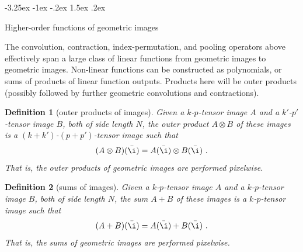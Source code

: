 \documentclass{article}
\makeatletter
\theoremstyle{plain}
\newtheorem{definition}{Definition}
\renewcommand\section{\@startsection {section}{1}{\z@}%
  {-3.25ex \@plus -1ex \@minus -.2ex}%
  {1.5ex \@plus .2ex}%
  {\raggedright\normalfont\large\bfseries}}
\makeatother
\begin{document}
\section{Higher-order functions of geometric images}\label{sec:nonlinear}

The convolution, contraction, index-permutation, and pooling operators above effectively span a large class of linear functions from geometric images to geometric images. Non-linear functions can be constructed as polynomials, or sums of products of linear function outputs.
Products here will be outer products (possibly followed by further geometric convolutions and contractions).

\begin{definition}[outer products of images]
Given a $k$-$p$-tensor image $A$ and a $k'$-$p'$-tensor image $B$, both of side length $N$, the outer product $A\otimes B$ of these images is a $(k+k')$-$(p+p')$-tensor image such that
\begin{equation}
    (A\otimes B)(\bar\i) = A(\bar\i)\otimes B(\bar\i) ~.
\end{equation}
That is, the outer products of geometric images are performed pixelwise.
\end{definition}

\begin{definition}[sums of images]
Given a $k$-$p$-tensor image $A$ and a $k$-$p$-tensor image $B$, both of side length $N$, the sum $A+B$ of these images is a $k$-$p$-tensor image such that
\begin{equation}
    (A+B)(\bar\i) = A(\bar\i)+B(\bar\i) ~.
\end{equation}
That is, the sums of geometric images are performed pixelwise.
\end{definition}
\end{document}
